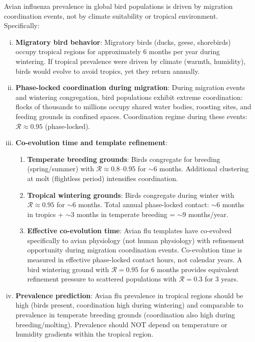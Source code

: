 \documentclass[11pt,twocolumn,a4paper]{article}
\newcommand{\Coord}{\mathcal{R}}
\begin{document}
\begin{theorem}
\label{thm:avian_flu}
Avian influenza prevalence in global bird populations is driven by migration coordination events, not by climate suitability or tropical environment. Specifically:

\begin{enumerate}[(i)]
\item \textbf{Migratory bird behavior}: Migratory birds (ducks, geese, shorebirds) occupy tropical regions for approximately 6 months per year during wintering. If tropical prevalence were driven by climate (warmth, humidity), birds would evolve to avoid tropics, yet they return annually.

\item \textbf{Phase-locked coordination during migration}: During migration events and wintering congregation, bird populations exhibit extreme coordination: flocks of thousands to millions occupy shared water bodies, roosting sites, and feeding grounds in confined spaces. Coordination regime during these events: $\Coord \approx 0.95$ (phase-locked).

\item \textbf{Co-evolution time and template refinement}:
\begin{enumerate}
\item \textbf{Temperate breeding grounds}: Birds congregate for breeding (spring/summer) with $\Coord \approx 0.8$--$0.95$ for $\sim$6 months. Additional clustering at molt (flightless period) intensifies coordination.
\item \textbf{Tropical wintering grounds}: Birds congregate during winter with $\Coord \approx 0.95$ for $\sim$6 months. Total annual phase-locked contact: $\sim$6 months in tropics + $\sim$3 months in temperate breeding = $\sim$9 months/year.
\item \textbf{Effective co-evolution time}: Avian flu templates have co-evolved specifically to avian physiology (not human physiology) with refinement opportunity during migration coordination events. Co-evolution time is measured in effective phase-locked contact hours, not calendar years. A bird wintering ground with $\Coord = 0.95$ for 6 months provides equivalent refinement pressure to scattered populations with $\Coord = 0.3$ for 3 years.
\end{enumerate}

\item \textbf{Prevalence prediction}: Avian flu prevalence in tropical regions should be high (birds present, coordination high during wintering) and comparable to prevalence in temperate breeding grounds (coordination also high during breeding/molting). Prevalence should NOT depend on temperature or humidity gradients within the tropical region.


\end{enumerate}
\end{theorem}
\end{document}
